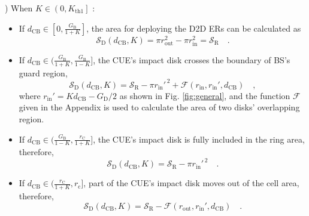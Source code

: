 \documentclass[journal, 10pt]{IEEEtran}
\begin{document}
) When $K \in \left(0,  K_\mathrm{th1}\right]$ :
\begin{itemize}
\item If $d_\mathrm{CB} \in [0, \frac{G_\mathrm{B}}{1+K}]$, the area for 
deploying the D2D ERs can be calculated as 
\begin{equation}
\mathcal{S}_{\mathrm{D}}\left(d_\mathrm{CB}, K\right) = \pi r _\mathrm{out}^2 
- \pi r_\mathrm{in}^2 = \mathcal{S}_{\mathrm{R}}\quad.
\end{equation}
\item  If $d_\mathrm{CB} \in (\frac{G_\mathrm{B}}{1+K}, \frac{G_\mathrm{B}}{1-K}]$, 
the CUE's impact disk crosses the boundary of BS's guard region, 
\begin{equation}
\mathcal{S}_{\mathrm{D}}\left(d_\mathrm{CB}, K\right) =  \mathcal{S}_{\mathrm{R}} 
- \pi r_\mathrm{in}'^{\,2} + \mathcal{F}\left(r_\mathrm{in}, r_\mathrm{in}', 
d_\mathrm{CB}\right)\quad,
\end{equation}
where $r_\mathrm{in}' = Kd_\mathrm{CB} - G_\mathrm{D}/2$ as shown in Fig. 
\ref{fig:general}, and the function $\mathcal{F}$ given in the Appendix is 
used to calculate the area of two disks' overlapping region.
\item If $d_\mathrm{CB} \in ( \frac{G_\mathrm{B}}{1-K}, \frac{r_\mathrm{C}}{1+K}]$, 
the CUE's impact disk is fully included in the ring area, therefore, 
\begin{equation}
\mathcal{S}_{\mathrm{D}}\left(d_\mathrm{CB}, K\right) =  
\mathcal{S}_{\mathrm{R}} - \pi r_\mathrm{in}'^{\,2} \quad.
\end{equation}
\item  If $d_\mathrm{CB} \in (\frac{r_\mathrm{C}}{1+K}, r_\mathrm{c}]$, 
part of the CUE's impact disk moves out of the cell area, therefore,  
\begin{equation}
\mathcal{S}_{\mathrm{D}}\left(d_\mathrm{CB}, K\right) =  
\mathcal{S}_{\mathrm{R}} -  \mathcal{F}\left(r_\mathrm{out}, r_\mathrm{in}', 
d_\mathrm{CB}\right)\quad. 
\end{equation} 
\end{itemize}
\end{document}
